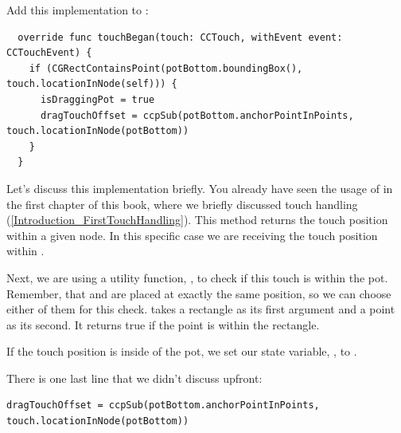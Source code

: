 \begin{leftbar}
Add this implementation to :
\begin{lstlisting}
  override func touchBegan(touch: CCTouch, withEvent event: CCTouchEvent) {
    if (CGRectContainsPoint(potBottom.boundingBox(), touch.locationInNode(self))) {
      isDraggingPot = true
      dragTouchOffset = ccpSub(potBottom.anchorPointInPoints, touch.locationInNode(potBottom))
    }
  }
\end{lstlisting}
\end{leftbar}

Let's discuss this implementation briefly. You already have seen the usage of 
 in the first chapter of this book,
where we briefly discussed touch handling
(\ref{Introduction_FirstTouchHandling}). This method returns the touch position
within a given node. In this specific case we are receiving the touch position
within .

Next, we are using a utility function, , to
check if this touch is within the pot. Remember,
that  and  are placed at exactly
the same position, so we can choose either of them for this check.
 takes a rectangle as its first argument and a
point as its second. It returns true if the point is within the rectangle.

If the touch position is inside of the pot, we set our state variable,
, to . 

There is one last line that we didn't discuss upfront:
\begin{lstlisting}
dragTouchOffset = ccpSub(potBottom.anchorPointInPoints, touch.locationInNode(potBottom))
\end{lstlisting}

